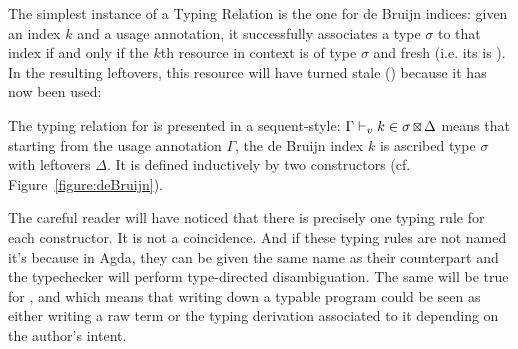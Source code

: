 The simplest instance of a Typing Relation is the one for de Bruijn
indices: given an index $k$ and a usage annotation, it successfully
associates a type $\ensuremath{\sigma}$ to that index if and only if the $k$th resource
in context is of type $\ensuremath{\sigma}$ and fresh (i.e. its \Usage{\ensuremath{\sigma}} is \fresh{\ensuremath{\sigma}}).
In the resulting leftovers, this resource will have turned stale (\stale{\ensuremath{\sigma}})
because it has now been used:

\begin{definition}
The typing relation for \Var{} is presented in a sequent-style: \ensuremath{\Gamma \vdash_v k \in \sigma \andalso{} \Delta}
means that starting from the usage annotation \ensuremath{\Gamma}, the de Bruijn index
$k$ is ascribed type \ensuremath{\sigma} with leftovers \ensuremath{\Delta}. It is defined inductively by
two constructors (cf. Figure~\ref{figure:deBruijn}).
\end{definition}



\begin{remark}The careful reader will have noticed that there is precisely
one typing rule for each \Var{} constructor. It is not a coincidence. And
if these typing rules are not named it's because in Agda, they can
be given the same name as their \Var{} counterpart and the typechecker will
perform type-directed disambiguation. The same will be true for \Inferable{},
\Checkable{} and \Pattern{} which means that writing down a typable program
could be seen as either writing a raw term or the typing derivation associated
to it depending on the author's intent.
\end{remark}

